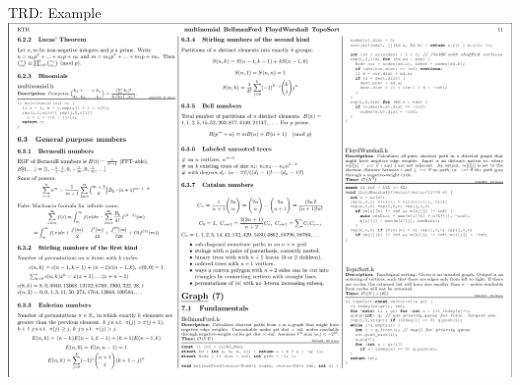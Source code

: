 \documentclass[11pt,pdf, aspectratio=169]{beamer}
\begin{document}
  \begin{frame}{TRD: Example}
    \includegraphics[width=.8\linewidth]{images/session-3/tcr-4}
  \end{frame}
\end{document}
